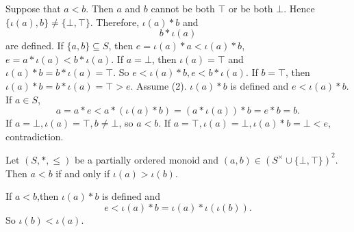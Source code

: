 \begin{proofenv}
    Suppose that $a<b$. Then $a$ and $b$ cannot be both $\top$ or be both $\bot$. Hence $\{\iota(a),b\}\not=\{\bot,\top\}$. Therefore, $\iota(a)*b$ and $$b*\iota(a)$$ are defined. If $\{a,b\}\subseteq S$, then $e=\iota(a)*a<\iota(a)*b$, $e=a*\iota(a)<b*\iota(a)$. If $a=\bot$, then $\iota(a)=\top$ and $\iota(a)*b=b*\iota(a)=\top$. So $e<\iota(a)*b,e<b*\iota(a)$. If $b=\top$, then $\iota(a)*b=b*\iota(a)=\top>e$.
    \newline
    Assume (2). $\iota(a)*b$ is defined and $e<\iota(a)*b$. If $a\in S$,
    $$a=a*e<a*(\iota(a)*b)=(a*\iota(a))*b=e*b=b.$$
    If $a=\bot, \iota(a)=\top, b\not=\bot$, so $a<b$. If $a=\top, \iota (a)=\bot, \iota(a)*b=\bot<e$, contradiction.
\end{proofenv}
\begin{corollaryenv}
    Let $(S,*,\le)$ be a partially ordered monoid and $(a,b)\in \left(S^\times\cup\{\bot,\top\}\right)^2$. Then $a<b$ if and only if $\iota(a)>\iota(b)$.
\end{corollaryenv}
\begin{proofenv}
    If $a<b$,then $\iota(a)*b$ is defined and 
    $$e<\iota(a)*b=\iota(a)*\iota(\iota(b)).$$
    So $\iota(b)<\iota(a)$.
\end{proofenv}